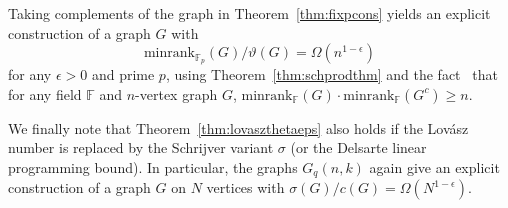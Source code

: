 \documentclass[11pt]{article}
\theoremstyle{definition}
\theoremstyle{remark}
\begin{document}
Taking complements of the graph in Theorem~\ref{thm:fixpcons} yields an explicit construction of a graph $G$ with \[\text{minrank}_{\mathbb{F}_{p}}(G)/\vartheta(G) = \Omega(n^{1-\epsilon})\] for any $\epsilon > 0$ and prime $p$, using Theorem~\ref{thm:schprodthm} and the fact~\cite{Peeters} that for any field $\mathbb{F}$ and $n$-vertex graph $G$, $\text{minrank}_{\mathbb{F}}(G) \cdot \text{minrank}_{\mathbb{F}}(G^c)\ge n$.

We finally note that Theorem~\ref{thm:lovaszthetaeps} also holds if the Lov\'asz number is replaced by the Schrijver variant $\sigma$ (or the Delsarte linear programming bound). In particular, the graphs $G_q(n, k)$ again give an explicit construction of a graph $G$ on $N$ vertices with $\sigma(G)/c(G) = \Omega(N^{1-\epsilon})$. 







\end{document}
